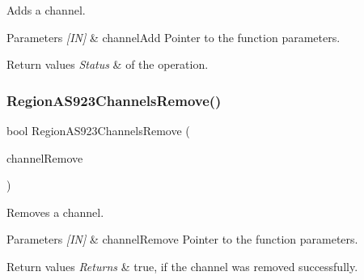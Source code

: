 Adds a channel. 


\begin{DoxyParams}{Parameters}
{\em \mbox{[}\+I\+N\mbox{]}} & channel\+Add Pointer to the function parameters.\\
\hline
\end{DoxyParams}

\begin{DoxyRetVals}{Return values}
{\em Status} & of the operation. \\
\hline
\end{DoxyRetVals}
\mbox{\label{group__REGIONAS923_ga288bc8bbec286314166d13033979678f}} 
\subsubsection{\texorpdfstring{Region\+A\+S923\+Channels\+Remove()}{RegionAS923ChannelsRemove()}}
{\footnotesize\ttfamily bool Region\+A\+S923\+Channels\+Remove (\begin{DoxyParamCaption}\item[{\hyperlink{group__REGION_gaa37468560d2fc81a977b57a48e5d72c0}{Channel\+Remove\+Params\+\_\+t} $\ast$}]{channel\+Remove }\end{DoxyParamCaption})}



Removes a channel. 


\begin{DoxyParams}{Parameters}
{\em \mbox{[}\+I\+N\mbox{]}} & channel\+Remove Pointer to the function parameters.\\
\hline
\end{DoxyParams}

\begin{DoxyRetVals}{Return values}
{\em Returns} & true, if the channel was removed successfully. \\
\hline
\end{DoxyRetVals}
\mbox{\label{group__REGIONAS923_ga33875aeda67698b7be396f9ef9b1d081}} 
